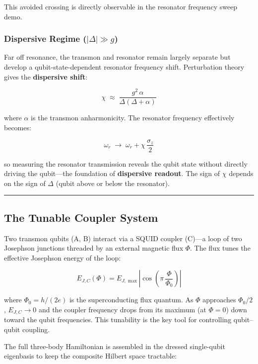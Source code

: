 \documentclass[11pt]{article}
\begin{document}
This avoided crossing is directly observable in the resonator frequency sweep demo.

\subsubsection{Dispersive Regime ($|\Delta| \gg g$)}

Far off resonance, the transmon and resonator remain largely separate but develop a
qubit-state-dependent resonator frequency shift. Perturbation theory gives the
\textbf{dispersive shift}:

\begin{equation}
  \chi \;\approx\; \frac{g^2\,\alpha}{\Delta(\Delta + \alpha)}
\end{equation}

where $\alpha$ is the transmon anharmonicity. The resonator frequency effectively becomes:

\begin{equation}
  \omega_r \;\to\; \omega_r + \chi\,\frac{\sigma_z}{2}
\end{equation}

so measuring the resonator transmission reveals the qubit state without directly driving the
qubit---the foundation of \textbf{dispersive readout}. The sign of $\chi$ depends on the sign
of $\Delta$ (qubit above or below the resonator).

\hrule
\vspace{1em}

\subsection{The Tunable Coupler System}

Two transmon qubits (A, B) interact via a SQUID coupler (C)---a loop of two Josephson
junctions threaded by an external magnetic flux $\Phi$. The flux tunes the effective Josephson
energy of the loop:

\begin{equation}
  E_{J,C}(\Phi) = E_{J,\max}\left|\cos\!\left(\pi\,\frac{\Phi}{\Phi_0}\right)\right|
\end{equation}

where $\Phi_0 = h/(2e)$ is the superconducting flux quantum. As $\Phi$ approaches $\Phi_0/2$,
$E_{J,C} \to 0$ and the coupler frequency drops from its maximum (at $\Phi = 0$) down toward
the qubit frequencies. This tunability is the key tool for controlling qubit--qubit coupling.

The full three-body Hamiltonian is assembled in the dressed single-qubit eigenbasis to keep the
composite Hilbert space tractable:
\end{document}
